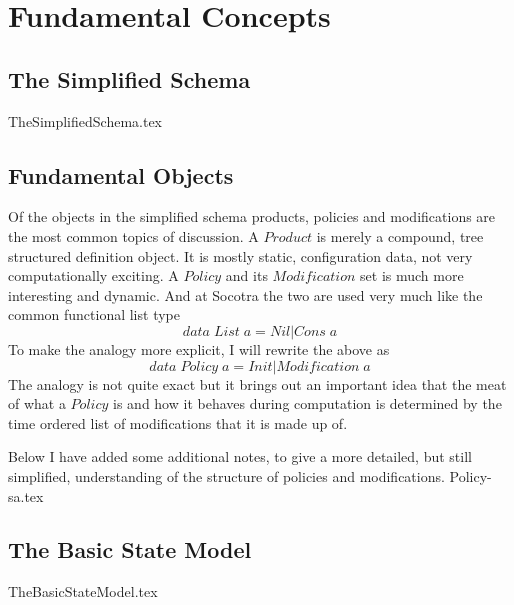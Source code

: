 
\chapter{Fundamental Concepts}
\label{intro} %


\section{The Simplified Schema}
\label{sec:01:1}
{TheSimplifiedSchema.tex}

\section{Fundamental Objects}
Of the objects in the simplified schema products, policies and modifications are the most common topics
of discussion. A $Product$ is merely a compound, tree structured definition object. It is mostly static,
configuration data, not very computationally exciting. A $Policy$ and its $Modification$ set is much more
interesting and dynamic. And at Socotra the two are used very much like the common functional list type
\begin{equation*}
  data \; List \; a = Nil | Cons \; a
\end{equation*}
To make the analogy more explicit, I will rewrite the above as
\begin{equation*}
  data \; Policy \; a = Init | Modification  \; a
\end{equation*}
The analogy is not quite exact but it brings out an important idea that the meat of what a $Policy$ is and
how it behaves during computation is determined by the time ordered list of modifications that it is made up
of.

Below I have added some additional notes, to give a more detailed, but still simplified, understanding of
the structure of policies and modifications.
\label{sec:01:2}
{Policy-sa.tex}

\section{The Basic State Model}
\label{sec:01:3}
{TheBasicStateModel.tex}



